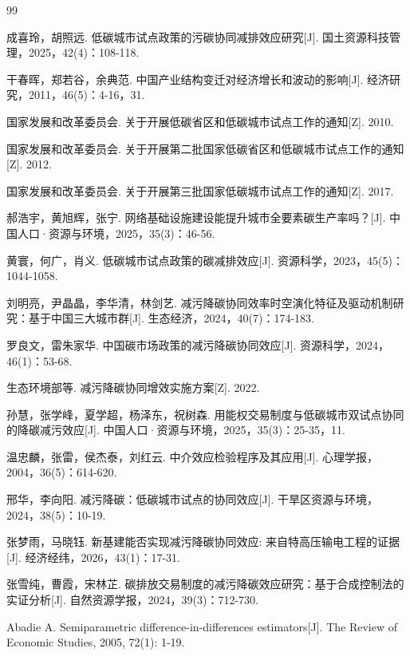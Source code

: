 \documentclass[12pt,a4paper]{ctexart}
\newcommand{\bodyfont}{\songti\fontsize{12pt}{24pt}\selectfont}
\begin{document}
\newpage
\begin{thebibliography}{99}
\bodyfont

成喜玲，胡照远. 低碳城市试点政策的污碳协同减排效应研究[J]. 国土资源科技管理，2025，42(4)：108-118.

干春晖，郑若谷，余典范. 中国产业结构变迁对经济增长和波动的影响[J]. 经济研究，2011，46(5)：4-16，31.

国家发展和改革委员会. 关于开展低碳省区和低碳城市试点工作的通知[Z]. 2010.

国家发展和改革委员会. 关于开展第二批国家低碳省区和低碳城市试点工作的通知[Z]. 2012.

国家发展和改革委员会. 关于开展第三批国家低碳城市试点工作的通知[Z]. 2017.

郝浩宇，黄旭辉，张宁. 网络基础设施建设能提升城市全要素碳生产率吗？[J]. 中国人口·资源与环境，2025，35(3)：46-56.

黄寰，何广，肖义. 低碳城市试点政策的碳减排效应[J]. 资源科学，2023，45(5)：1044-1058.

刘明亮，尹晶晶，李华清，林剑艺. 减污降碳协同效率时空演化特征及驱动机制研究：基于中国三大城市群[J]. 生态经济，2024，40(7)：174-183.

罗良文，雷朱家华. 中国碳市场政策的减污降碳协同效应[J]. 资源科学，2024，46(1)：53-68.

生态环境部等. 减污降碳协同增效实施方案[Z]. 2022.

孙慧，张学峰，夏学超，杨泽东，祝树森. 用能权交易制度与低碳城市双试点协同的降碳减污效应[J]. 中国人口·资源与环境，2025，35(3)：25-35，11.

温忠麟，张雷，侯杰泰，刘红云. 中介效应检验程序及其应用[J]. 心理学报，2004，36(5)：614-620.

邢华，李向阳. 减污降碳：低碳城市试点的协同效应[J]. 干旱区资源与环境，2024，38(5)：10-19.

张梦雨，马晓钰. 新基建能否实现减污降碳协同效应: 来自特高压输电工程的证据[J]. 经济经纬，2026，43(1)：17-31.

张雪纯，曹霞，宋林芷. 碳排放交易制度的减污降碳效应研究：基于合成控制法的实证分析[J]. 自然资源学报，2024，39(3)：712-730.

Abadie A. Semiparametric difference-in-differences estimators[J]. The Review of Economic Studies, 2005, 72(1): 1-19.


\end{thebibliography}
\end{document}

